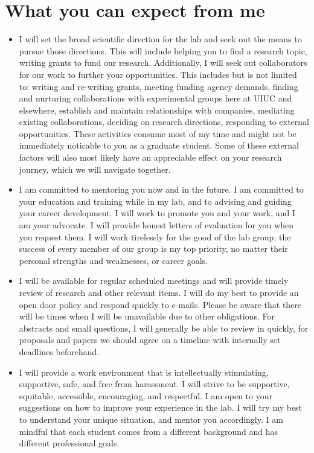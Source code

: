 \documentclass{article}
\begin{document}
 
\section*{What you can expect from me}
\begin{itemize}
	\item I will set the broad scientific direction for the lab and seek out the means to pursue those directions. This will include helping you to find a research topic, writing grants to fund our research. Additionally, I will seek out collaborators for our work to further your opportunities.  This includes but is not limited to: writing and re-writing grants, meeting funding agency demands,  finding and nurturing collaborations with experimental groups here at UIUC and elsewhere, establish and maintain relationships with companies, mediating  existing collaborations, deciding on research directions, responding to external opportunities.  These activities consume most of my time and might not be immediately noticable to you as a graduate student. Some of these external factors will also most likely have an appreciable effect on your research journey, which we will navigate together.
	\item I am committed to mentoring you now and in the future. I am committed to your education and training while in my lab, and to advising and guiding your career development. I will work to promote you and your work, and I am your advocate.  I will provide honest letters of evaluation for you
	when you request them. I will work tirelessly for the good of the lab group; the success of every member of our group is my top priority, no matter their personal strengths and weaknesses, or career goals.
	\item I will be available for regular scheduled meetings and will provide timely review of research and other relevant items. I will do my best to provide an open door policy and respond quickly to e-mails. Please be aware that there will be times when I will be unavailable due to other obligations. For abstracts and small questions, I will generally be able to review in quickly, for proposals and papers we should agree on a timeline with internally set deadlines  beforehand.
	\item 	I will provide a work environment that is intellectually stimulating, supportive, safe, and free from harassment. I will strive to be supportive, equitable, accessible, encouraging, and respectful. I am open to your suggestions on how to improve your experience in the lab.  I will try my best to understand your unique situation, and mentor you accordingly. I am mindful that each student comes from a different background and has different professional goals.

\end{itemize}
\end{document}
